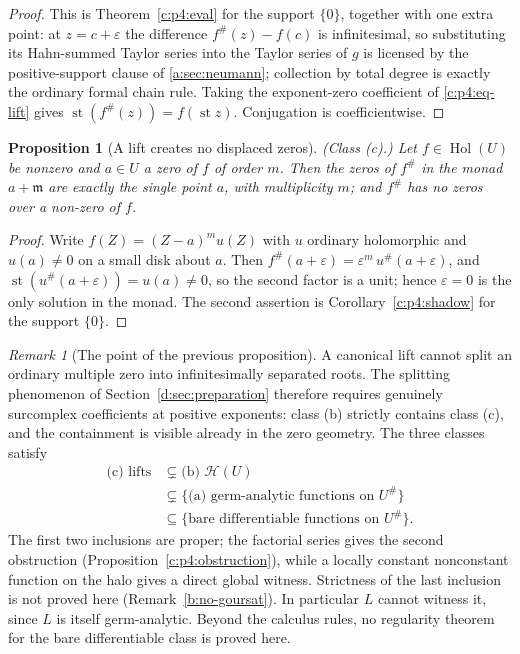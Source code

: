 \documentclass[11pt,a4paper]{article}
\numberwithin{equation}{section}
\newtheorem{proposition}[theorem]{Proposition}
\theoremstyle{definition}
\theoremstyle{remark}
\newtheorem{remark}[theorem]{Remark}
\theoremstyle{plain}
\newcommand{\mm}{\mathfrak m}
\DeclareMathOperator{\Hol}{Hol}
\DeclareMathOperator{\st}{st}
\newcommand{\halo}[1]{#1^{\#}}
\newcommand{\ev}[1]{#1^{\#}}
\newcommand{\Hc}{\mathcal H}
\begin{document}
\begin{proof}
This is Theorem~\ref{c:p4:eval} for the support $\{0\}$, together with
one extra point: at $z=c+\varepsilon$ the difference $\ev f(z)-f(c)$ is
infinitesimal, so substituting its Hahn-summed Taylor series into the
Taylor series of $g$ is licensed by the positive-support clause of
\ref{a:sec:neumann}; collection by total degree is exactly the ordinary
formal chain rule. Taking the exponent-zero coefficient of
\eqref{c:p4:eq-lift} gives $\st(\ev f(z))=f(\st z)$. Conjugation is
coefficientwise.
\end{proof}

\begin{proposition}[A lift creates no displaced zeros]
\label{c:p4:liftzeros}
\emph{(Class (c).)} Let $f\in\Hol(U)$ be nonzero and $a\in U$ a zero of
$f$ of order $m$. Then the zeros of $\ev f$ in the monad $a+\mm$ are
exactly the single point $a$, with multiplicity $m$; and $\ev f$ has no
zeros over a non-zero of $f$.
\end{proposition}

\begin{proof}
Write $f(Z)=(Z-a)^m u(Z)$ with $u$ ordinary holomorphic and
$u(a)\ne0$ on a small disk about $a$. Then
$\ev f(a+\varepsilon)=\varepsilon^{m}\,\ev u(a+\varepsilon)$, and
$\st(\ev u(a+\varepsilon))=u(a)\ne0$, so the second factor is a unit;
hence $\varepsilon=0$ is the only solution in the monad. The second
assertion is Corollary~\ref{c:p4:shadow} for the support $\{0\}$.
\end{proof}

\begin{remark}[The point of the previous proposition]
\label{c:p4:rk-liftzeros}
A canonical lift cannot split an ordinary multiple zero into
infinitesimally separated roots. The splitting phenomenon of
Section~\ref{d:sec:preparation} therefore requires genuinely surcomplex coefficients at
positive exponents: class (b) strictly contains class (c), and the
containment is visible already in the zero geometry. The three classes
satisfy
\[
 \begin{aligned}
 \text{(c) lifts}&\subsetneq\text{(b) }\Hc(U)\\
 &\subsetneq\{\text{(a) germ-analytic functions on }\halo U\}\\
 &\subseteq\{\text{bare differentiable functions on }\halo U\}.
 \end{aligned}
\]
The first two inclusions are proper; the factorial series gives the
second obstruction (Proposition~\ref{c:p4:obstruction}), while a
locally constant nonconstant function on the halo gives a direct global
witness. Strictness of the last inclusion is not proved here
(Remark~\ref{b:no-goursat}). In particular $L$ cannot witness it, since
$L$ is itself germ-analytic. Beyond the calculus rules, no regularity theorem for the
bare differentiable class is proved here.
\end{remark}
\end{document}
